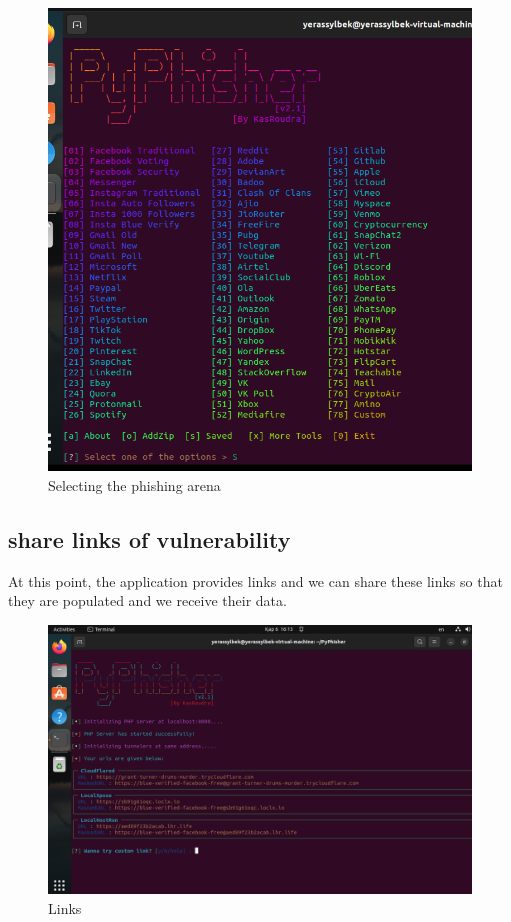 \documentclass[conference]{IEEEtran}
\begin{document}
\begin{figure}[htbp]
\centerline{
\includegraphics[scale = 0.2]{menu.png}
}
\caption{Selecting the phishing arena}
\label{fig}
\end{figure}


\subsection{share links of vulnerability}
At this point, the application provides links and we can share these links so that they are populated and we receive their data. 


\begin{figure}[htbp]
\centerline{
\includegraphics[scale = 0.2]{links.png}
}
\caption{Links}
\label{fig}
\end{figure}
\end{document}
